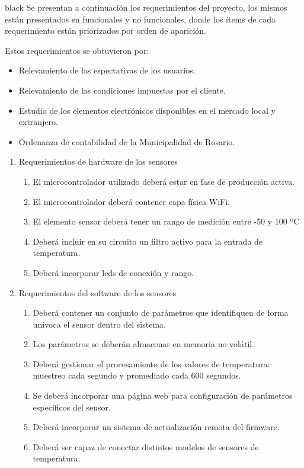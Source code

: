 \documentclass[11pt]{charter}
\begin{document}
\begin{consigna}{black}
Se presentan a continuación los requerimientos del proyecto, los mismos están presentados en funcionales y no funcionales, donde los ítems de cada requerimiento están priorizados por orden de aparición.

Estos requerimientos se obtuvieron por:
\begin{itemize}
\item Relevamiento de las espectativas de los usuarios.
\item Relevamiento de las condiciones impuestas por el cliente.
\item Estudio de los elementos electrónicos disponibles en el mercado local y extranjero.
\item Ordenanza de contabilidad de la Municipalidad de Rosario.
\end{itemize}

\begin{enumerate}
\item Requerimientos de hardware de los sensores
	\begin{enumerate}
	\item El microcontrolador utilizado deberá estar en fase de producción activa.
	\item El microcontrolador deberá contener capa física WiFi.	
	\item El elemento sensor deberá tener un rango de medición entre -50 y 100 ºC
	\item Deberá incluir en su circuito un filtro activo para la entrada de temperatura.
	\item Deberá incorporar leds de conexión y rango.	
	\end{enumerate}
	
\item Requerimientos del software de los sensores
	\begin{enumerate}
	\item Deberá contener un conjunto de parámetros que identifiquen de forma unívoca el sensor dentro del sistema.	
	\item Los parámetros se deberán almacenar en memoria no volátil.
	\item Deberá gestionar el procesamiento de los valores de temperatura: muestreo cada segundo y promediado cada 600 segundos.	
	\item Se deberá incorporar una página web para configuración de parámetros específicos del sensor.
	\item Deberá incorporar un sistema de actualización remota del firmware.
    \item Deberá ser capaz de conectar distintos modelos de sensores de temperatura.
	\end{enumerate}	
	

\end{enumerate}
\end{consigna}
\end{document}

